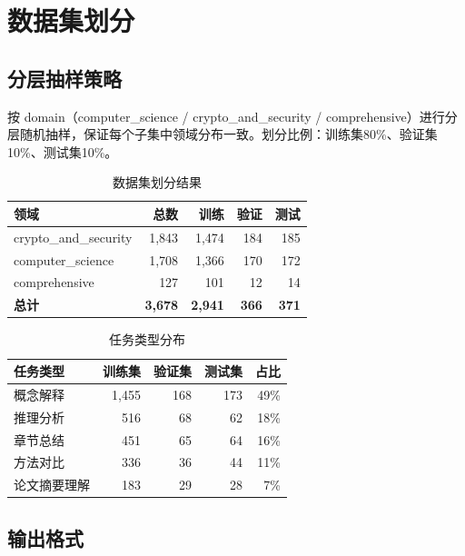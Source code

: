 \documentclass[12pt,a4paper]{ctexart}
\begin{document}
\section{数据集划分}

\subsection{分层抽样策略}

按 domain（computer\_science / crypto\_and\_security / comprehensive）进行分层随机抽样，保证每个子集中领域分布一致。划分比例：训练集80\%、验证集10\%、测试集10\%。

\begin{table}[htbp]\centering
\caption{数据集划分结果}
\begin{tabular}{@{}lrrrr@{}}
\toprule
\textbf{领域} & \textbf{总数} & \textbf{训练} & \textbf{验证} & \textbf{测试} \\
\midrule
crypto\_and\_security & 1,843 & 1,474 & 184 & 185 \\
computer\_science      & 1,708 & 1,366 & 170 & 172 \\
comprehensive          & 127   & 101   & 12  & 14 \\
\midrule
\textbf{总计}         & \textbf{3,678} & \textbf{2,941} & \textbf{366} & \textbf{371} \\
\bottomrule
\end{tabular}
\end{table}

\begin{table}[htbp]\centering
\caption{任务类型分布}
\begin{tabular}{@{}lrrrr@{}}
\toprule
\textbf{任务类型} & \textbf{训练集} & \textbf{验证集} & \textbf{测试集} & \textbf{占比} \\
\midrule
概念解释   & 1,455 & 168 & 173 & 49\% \\
推理分析   & 516   & 68  & 62  & 18\% \\
章节总结   & 451   & 65  & 64  & 16\% \\
方法对比   & 336   & 36  & 44  & 11\% \\
论文摘要理解 & 183 & 29  & 28  & 7\% \\
\bottomrule
\end{tabular}
\end{table}

\subsection{输出格式}
\end{document}
